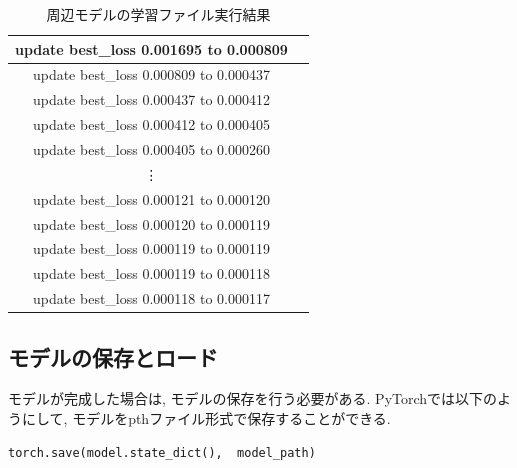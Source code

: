 \documentclass[dvipdfmx]{jsarticle}
\newcommand{\Add}[1]{\textcolor{red}{#1}}
\begin{document}
\begin{itemize}
\begin{table}[H]
\begin{tabular}{|c|c|}
        
        
        
        

            \hline
            update best\_loss 0.001695 to 0.000809 \\
            \hline
            
            update best\_loss 0.000809 to 0.000437 \\
            \hline
            
            update best\_loss 0.000437 to 0.000412 \\
            \hline
            
            update best\_loss 0.000412 to 0.000405 \\
            \hline
            
            update best\_loss 0.000405 to 0.000260 \\
            \hline

            \vdots \\
            \hline
            
            
            
            
            

            update best\_loss 0.000121 to 0.000120 \\
            \hline
            
            update best\_loss 0.000120 to 0.000119 \\
            \hline
            
            update best\_loss 0.000119 to 0.000119 \\
            \hline
            
            update best\_loss 0.000119 to 0.000118 \\
            \hline
            
            update best\_loss 0.000118 to 0.000117 \\
            \hline
        \end{tabular}
        \caption{周辺モデルの学習ファイル実行結果}
        \label{makemodel4}
    \end{table}
\end{itemize}

\subsection{モデルの保存とロード}

モデルが完成した場合は, モデルの保存を行う必要がある.
PyTorchでは以下のようにして, モデルをpthファイル形式で保存することができる.
\begin{lstlisting}
torch.save(model.state_dict(),  model_path)
\end{lstlisting}
\end{document}
